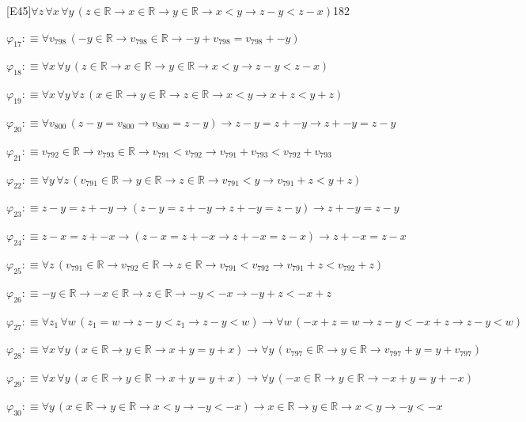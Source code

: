 \begin{fullproof}{[E45]}{$\forall z\,\forall x\,\forall y\,(z \in \mathbb{R} \to x \in \mathbb{R} \to y \in \mathbb{R} \to x < y \to z - y < z - x)$}{182}
\begin{abbrevlist}
\item $\varphi_{17} :\equiv \forall v_{798}\,(-y \in \mathbb{R} \to v_{798} \in \mathbb{R} \to -y + v_{798} = v_{798} + -y)$
\item $\varphi_{18} :\equiv \forall x\,\forall y\,(z \in \mathbb{R} \to x \in \mathbb{R} \to y \in \mathbb{R} \to x < y \to z - y < z - x)$
\item $\varphi_{19} :\equiv \forall x\,\forall y\,\forall z\,(x \in \mathbb{R} \to y \in \mathbb{R} \to z \in \mathbb{R} \to x < y \to x + z < y + z)$
\item $\varphi_{20} :\equiv \forall v_{800}\,(z - y = v_{800} \to v_{800} = z - y) \to z - y = z + -y \to z + -y = z - y$
\item $\varphi_{21} :\equiv v_{792} \in \mathbb{R} \to v_{793} \in \mathbb{R} \to v_{791} < v_{792} \to v_{791} + v_{793} < v_{792} + v_{793}$
\item $\varphi_{22} :\equiv \forall y\,\forall z\,(v_{791} \in \mathbb{R} \to y \in \mathbb{R} \to z \in \mathbb{R} \to v_{791} < y \to v_{791} + z < y + z)$
\item $\varphi_{23} :\equiv z - y = z + -y \to (z - y = z + -y \to z + -y = z - y) \to z + -y = z - y$
\item $\varphi_{24} :\equiv z - x = z + -x \to (z - x = z + -x \to z + -x = z - x) \to z + -x = z - x$
\item $\varphi_{25} :\equiv \forall z\,(v_{791} \in \mathbb{R} \to v_{792} \in \mathbb{R} \to z \in \mathbb{R} \to v_{791} < v_{792} \to v_{791} + z < v_{792} + z)$
\item $\varphi_{26} :\equiv -y \in \mathbb{R} \to -x \in \mathbb{R} \to z \in \mathbb{R} \to -y < -x \to -y + z < -x + z$
\item $\varphi_{27} :\equiv \forall z_{1}\,\forall w\,(z_{1} = w \to z - y < z_{1} \to z - y < w) \to \forall w\,(-x + z = w \to z - y < -x + z \to z - y < w)$
\item $\varphi_{28} :\equiv \forall x\,\forall y\,(x \in \mathbb{R} \to y \in \mathbb{R} \to x + y = y + x) \to \forall y\,(v_{797} \in \mathbb{R} \to y \in \mathbb{R} \to v_{797} + y = y + v_{797})$
\item $\varphi_{29} :\equiv \forall x\,\forall y\,(x \in \mathbb{R} \to y \in \mathbb{R} \to x + y = y + x) \to \forall y\,(-x \in \mathbb{R} \to y \in \mathbb{R} \to -x + y = y + -x)$
\item $\varphi_{30} :\equiv \forall y\,(x \in \mathbb{R} \to y \in \mathbb{R} \to x < y \to -y < -x) \to x \in \mathbb{R} \to y \in \mathbb{R} \to x < y \to -y < -x$

\end{abbrevlist}
\end{fullproof}

